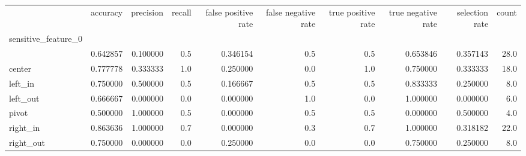 \begin{tabular}{lrrrrrrrrr}
\toprule
{} &  accuracy &  precision &  recall &  false positive rate &  false negative rate &  true positive rate &  true negative rate &  selection rate &  count \\
sensitive\_feature\_0 &           &            &         &                      &                      &                     &                     &                 &        \\
\midrule
                    &  0.642857 &   0.100000 &     0.5 &             0.346154 &                  0.5 &                 0.5 &            0.653846 &        0.357143 &   28.0 \\
center              &  0.777778 &   0.333333 &     1.0 &             0.250000 &                  0.0 &                 1.0 &            0.750000 &        0.333333 &   18.0 \\
left\_in             &  0.750000 &   0.500000 &     0.5 &             0.166667 &                  0.5 &                 0.5 &            0.833333 &        0.250000 &    8.0 \\
left\_out            &  0.666667 &   0.000000 &     0.0 &             0.000000 &                  1.0 &                 0.0 &            1.000000 &        0.000000 &    6.0 \\
pivot               &  0.500000 &   1.000000 &     0.5 &             0.000000 &                  0.5 &                 0.5 &            0.000000 &        0.500000 &    4.0 \\
right\_in            &  0.863636 &   1.000000 &     0.7 &             0.000000 &                  0.3 &                 0.7 &            1.000000 &        0.318182 &   22.0 \\
right\_out           &  0.750000 &   0.000000 &     0.0 &             0.250000 &                  0.0 &                 0.0 &            0.750000 &        0.250000 &    8.0 \\
\bottomrule
\end{tabular}
